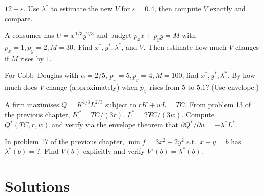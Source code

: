 \begin{problems}
        $12 + \varepsilon$. Use $\lambda^*$ to estimate the new $V$ for
        $\varepsilon = 0.4$, then compute $V$ exactly and compare.
  \item A consumer has $U = x^{1/3} y^{2/3}$ and budget
        $p_x x + p_y y = M$ with $p_x = 1, p_y = 2, M = 30$. Find
        $x^*, y^*, \lambda^*$, and $V$. Then estimate how much $V$ changes
        if $M$ rises by $1$.
  \item For Cobb--Douglas with $\alpha = 2/5$, $p_x = 5, p_y = 4,
        M = 100$, find $x^*, y^*, \lambda^*$. By how much does $V$ change
        (approximately) when $p_x$ rises from $5$ to $5.1$? (Use
        envelope.)
  \item A firm maximises $Q = K^{1/3} L^{2/3}$ subject to
        $r K + w L = TC$. From problem 13 of the previous chapter,
        $K^* = TC/(3 r)$, $L^* = 2 TC/(3 w)$. Compute $Q^*(TC, r, w)$ and
        verify via the envelope theorem that
        $\partial Q^*/\partial w = -\lambda^* L^*$.
  \item In problem 17 of the previous chapter,
        $\min f = 3 x^2 + 2 y^2$ s.t.\ $x + y = b$ has
        $\lambda^*(b) = ?$. Find $V(b)$ explicitly and verify
        $V'(b) = \lambda^*(b)$.
\end{problems}

\section{Solutions}


